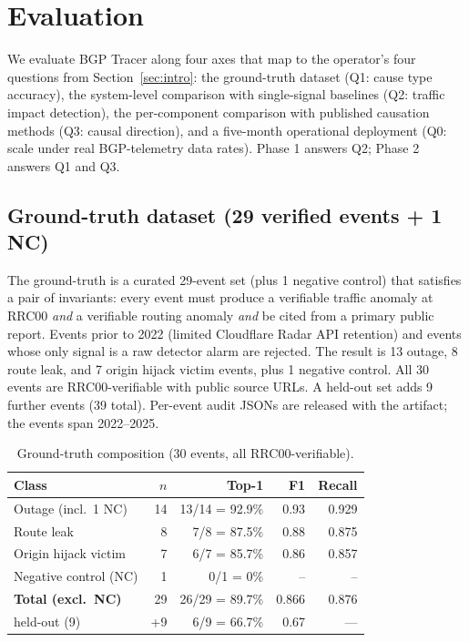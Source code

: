 \section{Evaluation}
\label{sec:eval}

We evaluate BGP Tracer along four axes that map to the operator's four questions from Section~\ref{sec:intro}: the ground-truth dataset (Q1: cause type accuracy), the system-level comparison with single-signal baselines (Q2: traffic impact detection), the per-component comparison with published causation methods (Q3: causal direction), and a five-month operational deployment (Q0: scale under real BGP-telemetry data rates). Phase 1 answers Q2; Phase 2 answers Q1 and Q3.

\subsection{Ground-truth dataset (29 verified events + 1 NC)}
The ground-truth is a curated 29-event set (plus 1 negative control) that satisfies a pair of invariants: every event must produce a verifiable traffic anomaly at RRC00 \emph{and} a verifiable routing anomaly \emph{and} be cited from a primary public report. Events prior to 2022 (limited Cloudflare Radar API retention) and events whose only signal is a raw detector alarm are rejected. The result is 13 outage, 8 route leak, and 7 origin hijack victim events, plus 1 negative control. All 30 events are RRC00-verifiable with public source URLs. A held-out set adds 9 further events (39 total). Per-event audit JSONs are released with the artifact; the events span 2022--2025.

\begin{table}[t]
\centering
\caption{Ground-truth composition (30 events, all RRC00-verifiable).}
\label{tab:dataset}
\small
\begin{tabular}{l r r r r}
\hline
\textbf{Class} & \textbf{$n$} & \textbf{Top-1} & \textbf{F1} & \textbf{Recall} \\
\hline
Outage (incl.\ 1 NC)  & 14 & 13/14 = 92.9\% & 0.93 & 0.929 \\
Route leak            &  8 &  7/8  = 87.5\% & 0.88 & 0.875 \\
Origin hijack victim  &  7 &  6/7  = 85.7\% & 0.86 & 0.857 \\
Negative control (NC) &  1 &  0/1  =   0\% & --   & --    \\
\hline
\textbf{Total (excl.\ NC)} & 29 & 26/29 = 89.7\% & 0.866 & 0.876 \\
\hline
held-out (9)     & +9 & 6/9 = 66.7\% & 0.67 & ---   \\
\hline
\end{tabular}
\end{table}


